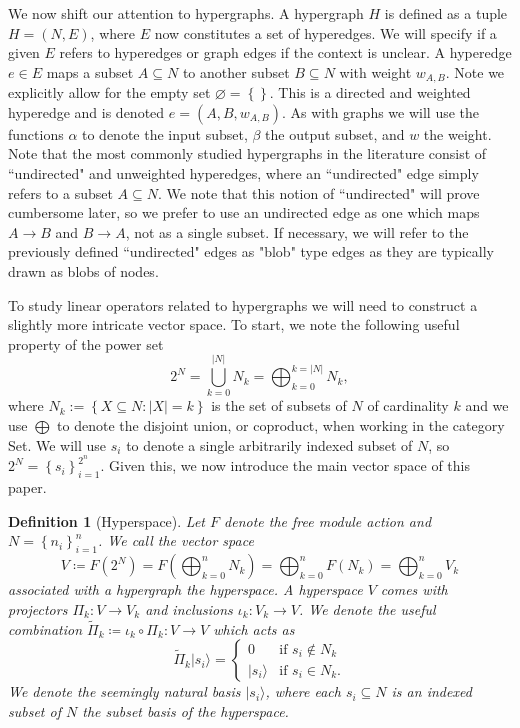 \documentclass{article}
\newcommand{\ket}[1]{|#1\rangle}
\newcommand{\parens}[1]{\left( #1 \right)}
\newcommand{\set}[1]{\left\{ #1 \right\}}
\newcommand{\fullProj}{\widetilde{\Pi}}
\newcommand{\basei}{\ket{s_i}}
\newtheorem{defn}{Definition}
\begin{document}
We now shift our attention to hypergraphs. A hypergraph $H$ is defined as a tuple $H = (N, E)$, where $E$ now constitutes a set of hyperedges. We will specify if a given $E$ refers to hyperedges or graph edges if the context is unclear. A hyperedge $e \in E$ maps a subset $A \subseteq N$ to another subset $B \subseteq N$ with weight $w_{A, B}$. Note we explicitly allow for the empty set $\varnothing = \set{}$. This is a directed and weighted hyperedge and is denoted $e = (A, B, w_{A,B})$. As with graphs we will use the functions $\alpha$ to denote the input subset, $\beta$ the output subset, and $w$ the weight. Note that the most commonly studied hypergraphs in the literature consist of ``undirected" and unweighted hyperedges, where an ``undirected" edge simply refers to a subset $A \subseteq N$. We note that this notion of ``undirected" will prove cumbersome later, so we prefer to use an undirected edge as one which maps $A \to B$ and $B \to A$, not as a single subset. If necessary, we will refer to the previously defined ``undirected" edges as "blob" type edges as they are typically drawn as blobs of nodes.



To study linear operators related to hypergraphs we will need to construct a slightly more intricate vector space. To start, we note the following useful property of the power set 
\begin{equation}
    2^N =  \bigcup_{k=0}^{|N|} N_k = \bigoplus_{k=0}^{k = |N|} N_k,
\end{equation}
where $N_k := \set{X \subseteq N : |X| = k}$ is the set of subsets of $N$ of cardinality $k$ and we use $\bigoplus$ to denote the disjoint union, or coproduct, when working in the category Set. We will use $s_i$ to denote a single arbitrarily indexed subset of $N$, so $2^N = \set{s_i}_{i=1}^{2^n}$. Given this, we now introduce the main vector space of this paper.

\begin{defn}[Hyperspace]
    Let $F$ denote the free module action and $N = \set{n_i}_{i=1}^n$. We call the vector space $$V \coloneqq F \parens{2^N} = F \parens{\bigoplus_{k=0}^n N_k} = \bigoplus_{k=0}^n F(N_k) = \bigoplus_{k=0}^n V_k $$ associated with a hypergraph the hyperspace. A hyperspace $V$ comes with projectors $\Pi_k : V \to V_k$ and inclusions $\iota_k : V_k \to V$. We denote the useful combination $\fullProj_k \coloneqq \iota_k \circ \Pi_k : V \to V$ which acts as
    \begin{equation}
        \fullProj_k \basei = \begin{cases}
            0 & \text{if } s_i \notin N_k \\
            \basei & \text{if } s_i \in N_k .
        \end{cases}
    \end{equation} We denote the seemingly natural basis $\basei$, where each $s_i \subseteq N$ is an indexed subset of $N$ the subset basis of the hyperspace.
\end{defn}
\end{document}

